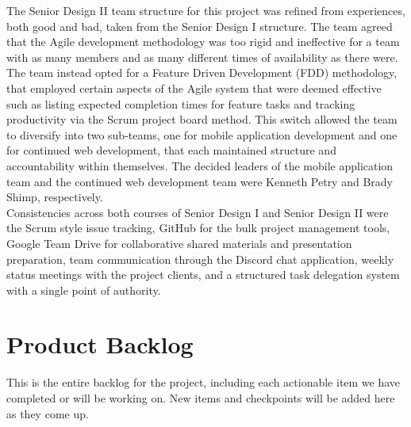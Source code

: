 The Senior Design II team structure for this project was refined from experiences, both good and bad, taken from the Senior Design I structure.  The team agreed that the Agile development methodology was too rigid and ineffective for a team with as many members and as many different times of availability as there were.  The team instead opted for a Feature Driven Development (FDD) methodology, that employed certain aspects of the Agile system that were deemed effective such as listing expected completion times for feature tasks and tracking productivity via the Scrum project board method. This switch allowed the team to diversify into two sub-teams, one for mobile application development and one for continued web development, that each maintained structure and accountability within themselves.  The decided leaders of the mobile application team and the continued web development team were Kenneth Petry and Brady Shimp, respectively.\\

Consistencies across both courses of Senior Design I and Senior Design II were the Scrum style issue tracking, GitHub for the bulk project management tools, Google Team Drive for collaborative shared materials and presentation preparation, team communication through the Discord chat application, weekly status meetings with the project clients, and a structured task delegation system with a single point of authority.





\section{Product Backlog}


This is the entire backlog for the project, including each actionable item we 
have completed or will be working on. New items and checkpoints will be added 
here as they come up.

